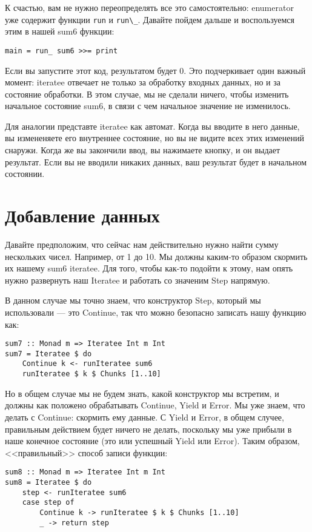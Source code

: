 К счастью, вам не нужно переопределять все это самостоятельно: enumerator уже содержит функции \lstinline'run' и \lstinline'run\_'. Давайте пойдем дальше и воспользуемся этим в нашей sum6 функции:

\begin{lstlisting}
main = run_ sum6 >>= print
\end{lstlisting}

Если вы запустите этот код, результатом будет 0. Это подчеркивает один важный момент: iteratee отвечает не только за обработку входных данных, но и за состояние обработки. В этом случае, мы не сделали ничего, чтобы изменить начальное состояние sum6, в связи с чем начальное значение не изменилось.

Для аналогии представте iteratee как автомат. Когда вы вводите в него данные, вы измененяете его внутреннее состояние, но вы не видите всех этих изменений снаружи. Когда же вы закончили ввод, вы нажимаете кнопку, и он выдает результат. Если вы не вводили никаких данных, ваш результат будет в начальном состоянии.

\section{Добавление данных}

Давайте предположим, что сейчас нам действительно нужно найти сумму нескольких чисел. Например, от 1 до 10. Мы должны каким-то образом скормить их нашему sum6 iteratee. Для того, чтобы как-то подойти к этому, нам опять нужно развернуть наш Iteratee и работать со значеним Step напрямую.

В данном случае мы точно знаем, что конструктор Step, который мы использовали --- это Continue, так что можно безопасно записать нашу функцию как:

\begin{lstlisting}
sum7 :: Monad m => Iteratee Int m Int
sum7 = Iteratee $ do
    Continue k <- runIteratee sum6
    runIteratee $ k $ Chunks [1..10]
\end{lstlisting}%

Но в общем случае мы не будем знать, какой конструктор мы встретим, и должны как положено обрабатывать Continue, Yield и Error. Мы уже знаем, что делать с Continue: скормить ему данные. С Yield и Error, в общем случее, правильным действием будет ничего не делать, поскольку мы уже прибыли в наше конечное состояние (это или успешный Yield или Error). Таким образом, <<правильный>> способ записи функции:

\begin{lstlisting}
sum8 :: Monad m => Iteratee Int m Int
sum8 = Iteratee $ do
    step <- runIteratee sum6
    case step of
        Continue k -> runIteratee $ k $ Chunks [1..10]
        _ -> return step
\end{lstlisting}%

